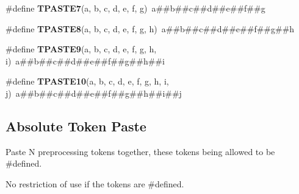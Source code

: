 \begin{DoxyCompactItemize}
\item 
\hypertarget{group__group__xmega__utils__tpaste_gad36c0d6224338a4f8738aa25659afc14}{\#define {\bfseries T\-P\-A\-S\-T\-E7}(a, b, c, d, e, f, g)~a\#\#b\#\#c\#\#d\#\#e\#\#f\#\#g}\label{group__group__xmega__utils__tpaste_gad36c0d6224338a4f8738aa25659afc14}

\item 
\hypertarget{group__group__xmega__utils__tpaste_gaf7aff743d5c0d66a81a13268b1a7e222}{\#define {\bfseries T\-P\-A\-S\-T\-E8}(a, b, c, d, e, f, g, h)~a\#\#b\#\#c\#\#d\#\#e\#\#f\#\#g\#\#h}\label{group__group__xmega__utils__tpaste_gaf7aff743d5c0d66a81a13268b1a7e222}

\item 
\hypertarget{group__group__xmega__utils__tpaste_ga5440e5a665d859bec7c3527312d0889d}{\#define {\bfseries T\-P\-A\-S\-T\-E9}(a, b, c, d, e, f, g, h, i)~a\#\#b\#\#c\#\#d\#\#e\#\#f\#\#g\#\#h\#\#i}\label{group__group__xmega__utils__tpaste_ga5440e5a665d859bec7c3527312d0889d}

\item 
\hypertarget{group__group__xmega__utils__tpaste_ga0235b2e4ccf7a5b1d022a729a17a78a2}{\#define {\bfseries T\-P\-A\-S\-T\-E10}(a, b, c, d, e, f, g, h, i, j)~a\#\#b\#\#c\#\#d\#\#e\#\#f\#\#g\#\#h\#\#i\#\#j}\label{group__group__xmega__utils__tpaste_ga0235b2e4ccf7a5b1d022a729a17a78a2}

\end{DoxyCompactItemize}
\subsection*{Absolute Token Paste}
\label{_amgrp61c59096cd4b7958303a985954baa7ca}%
 Paste N preprocessing tokens together, these tokens being allowed to be \#defined.

No restriction of use if the tokens are \#defined.


